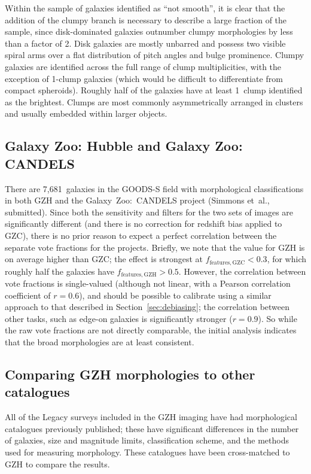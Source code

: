 \documentclass[a4paper,fleqn,usenatbib]{mnras}
\begin{document}
Within the sample of galaxies identified as ``not smooth'', it is clear that
the addition of the clumpy branch is necessary to describe a large fraction of
the sample, since disk-dominated galaxies outnumber clumpy morphologies by less than
a factor of 2. Disk galaxies are mostly unbarred \citep{mel14} and
possess two visible spiral arms over a flat distribution of pitch angles and
bulge prominence. Clumpy galaxies are identified across the full range of clump
multiplicities, with the exception of 1-clump galaxies (which would be
difficult to differentiate from compact spheroids). Roughly half of the
galaxies have at least 1~clump identified as the brightest. Clumps are most
commonly asymmetrically arranged in clusters and usually embedded within
larger objects. 

\subsection{Galaxy Zoo: Hubble and Galaxy Zoo: CANDELS}\label{ssec:gzh_gzc}

There are 7,681~galaxies in the GOODS-S field with morphological
classifications in both GZH and the Galaxy~Zoo:~CANDELS project (Simmons
et~al., submitted). Since both the sensitivity and filters for the two sets of
images are significantly different (and there is no correction for redshift
bias applied to GZC), there is no prior reason to expect a perfect correlation
between the separate vote fractions for the projects. Briefly, we note that the
\ffeatures{} value for GZH is on average higher than GZC; the effect is
strongest at $f_\mathrm{features,GZC}<0.3$, for which roughly half the galaxies
have $f_\mathrm{features,GZH}>0.5$. However, the correlation between vote
fractions is single-valued (although not linear, with a Pearson correlation
coefficient of $r=0.6$), and should be possible to calibrate using a similar
approach to that described in Section~\ref{sec:debiasing}; the correlation
between other tasks, such as edge-on galaxies is significantly stronger
($r=0.9$). So while the raw vote fractions are not directly comparable, the
initial analysis indicates that the broad morphologies are at least consistent.

\subsection{Comparing GZH morphologies to other catalogues}\label{ssec:comparisons}

All of the Legacy surveys included in the GZH imaging have had morphological
catalogues previously published; these have significant differences in
the number of galaxies, size and magnitude limits, classification scheme, and
the methods used for measuring morphology. These catalogues have been
cross-matched to GZH to compare the results. 
\end{document}
